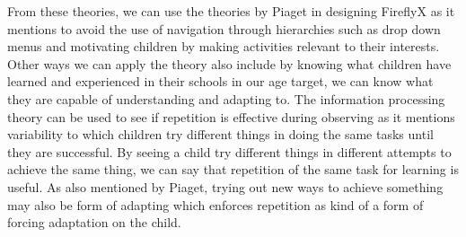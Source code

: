 From these theories, we can use the theories by Piaget in designing FireflyX as it mentions to avoid the use of navigation through hierarchies such as drop down menus and motivating children by making activities relevant to their interests. Other ways we can apply the theory also include by knowing what children have learned and experienced in their schools in our age target, we can know what they are capable of understanding and adapting to. The information processing theory can be used to see if repetition is effective during observing as it mentions variability to which children try different things in doing the same tasks until they are successful. By seeing a child try different things in different attempts to achieve the same thing, we can say that repetition of the same task for learning is useful. As also mentioned by Piaget, trying out new ways to achieve something may also be form of adapting which enforces repetition as kind of a form of forcing adaptation on the child. 





